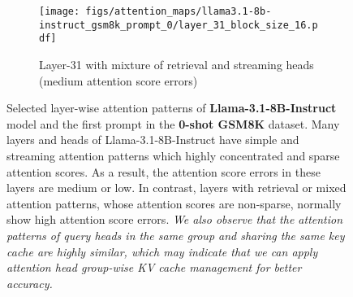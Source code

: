 \begin{figure}
\begin{subfigure}{0.72\columnwidth}
    \end{subfigure}
    \begin{subfigure}{0.72\columnwidth}
    \texttt{[image: figs/attention\_maps/llama3.1-8b-instruct\_gsm8k\_prompt\_0/layer\_31\_block\_size\_16.pdf]}
    \caption{Layer-31 with mixture of retrieval and streaming heads (medium attention score errors)}
    \label{fig:attention_pattern_Llama3.1-8B-Instruct_gsm8k_zeroshot_first_prompt_layer_31}
    \end{subfigure}
    \caption{Selected layer-wise attention patterns of \textbf{Llama-3.1-8B-Instruct} model and the first prompt in the \textbf{0-shot GSM8K} dataset. Many layers and heads of Llama-3.1-8B-Instruct have simple and streaming attention patterns which highly concentrated and sparse attention scores. As a result, the attention score errors in these layers are medium or low. In contrast, layers with retrieval or mixed attention patterns, whose attention scores are non-sparse, normally show high attention score errors. \textit{We also observe that the attention patterns of query heads in the same group and sharing the same key cache are highly similar, which may indicate that we can apply attention head group-wise KV cache management for better accuracy.}}
\label{fig:selected_layer_wise_attention_patterns_llama3.1-8B-Instruct_gsm8k_zeroshot_first_prompt}
\end{figure}

